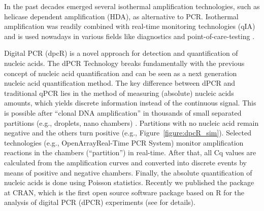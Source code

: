 In the past decades 
emerged several isothermal amplification technologies, such as helicase 
dependent amplification (HDA), as alternative to PCR. Isothermal amplification 
was readily combined with real-time monitoring technologies (qIA) and is used 
nowadays in various fields like diagnostics and point-of-care-testing 
\citep{rodiger_nucleic_2014}.

Digital PCR (dpcR) is a novel approach for detection and quantification of 
nucleic acids. The dPCR Technology breaks fundamentally with the previous 
concept of nucleic acid quantification and can be seen as a next generation 
nucleic acid quantification method. The key difference between dPCR and 
traditional qPCR lies in the method of measuring (absolute) nucleic acids 
amounts, which yields discrete information instead of the continuous signal. 
This is possible after ``clonal DNA amplification'' in thousands of small 
separated partitions (e.g., droplets, nano chambers) \citep{huggett_2013, 
milbury_2014, morley_2014}. Partitions with no nucleic acid remain negative and 
the others turn positive (e.g., Figure~\ref{figure:dpcR_sim}). Selected 
technologies (e.g., OpenArray\textregistered Real-Time PCR System) monitor 
amplification reactions in the chambers (``partition'') in real-time. After that, 
all Cq values are calculated from the amplification curves and converted into 
discrete events by means of positive and negative chambers. Finally, the 
absolute quantification of nucleic acids is done using Poisson statistics. 
Recently we published the  package at CRAN, which is the first 
open source software package based on R for the analysis of digital PCR (dPCR) 
experiments (see  for details).

